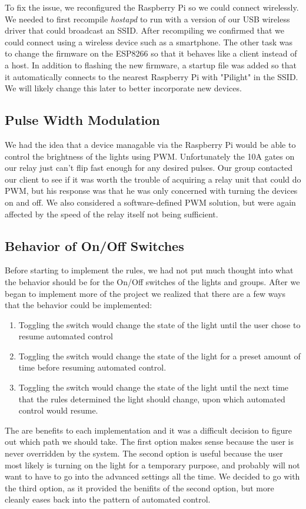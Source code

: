 \documentclass[oneside,openright]{book}
\begin{document}
To fix the issue, we reconfigured the Raspberry Pi so we could connect wirelessly. We needed to first recompile \textit{hostapd} to run with a version of our USB wireless driver that could broadcast an SSID. After recompiling we confirmed that we could connect using a wireless device such as a smartphone. The other task was to change the firmware on the ESP8266 so that it behaves like a client instead of a host. In addition to flashing the new firmware, a startup file was added so that it automatically connects to the nearest Raspberry Pi with "Pilight" in the SSID. We will likely change this later to better incorporate new devices.

\subsection{Pulse Width Modulation}
We had the idea that a device managable via the Raspberry Pi would be able to control the brightness of the lights using PWM. Unfortunately the 10A gates on our relay just can't flip fast enough for any desired pulses. Our group contacted our client to see if it was worth the trouble of acquiring a relay unit that could do PWM, but his response was that he was only concerned with turning the devices on and off. We also considered a software-defined PWM solution, but were again affected by the speed of the relay itself not being sufficient.

\subsection{Behavior of On/Off Switches}
Before starting to implement the rules, we had not put much thought into what the behavior should be for the On/Off switches of the lights and groups. After we began to implement more of the project we realized that there are a few ways that the behavior could be implemented:
\begin{enumerate}
  \item Toggling the switch would change the state of the light until the user chose to resume automated control
  \item Toggling the switch would change the state of the light for a preset amount of time before resuming automated control.
  \item Toggling the switch would change the state of the light until the next time that the rules determined the light should change, upon which automated control would resume.
\end{enumerate}
The are benefits to each implementation and it was a difficult decision to figure out which path we should take. The first option makes sense because the user is never overridden by the system. The second option is useful because the user most likely is turning on the light for a temporary purpose, and probably will not want to have to go into the advanced settings all the time. We decided to go with the third option, as it provided the benifits of the second option, but more cleanly eases back into the pattern of automated control.
\end{document}
